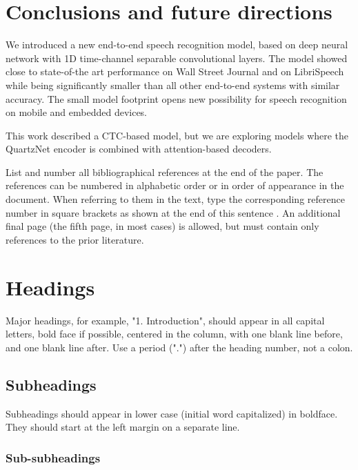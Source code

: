 \documentclass{article}
\begin{document}
\section{Conclusions and future directions}
\label{sec:conclusions}
We introduced a new end-to-end speech recognition model, based on deep neural network with 1D time-channel separable convolutional layers. The model showed close to state-of-the art performance on Wall Street Journal and on LibriSpeech while being significantly smaller than all other end-to-end systems with similar accuracy. The small model footprint opens new possibility for speech recognition on mobile and embedded devices.

This work described a CTC-based model, but we are exploring models where the QuartzNet encoder is combined with attention-based decoders.






\iffalse
List and number all bibliographical references at the end of the
paper. The references can be numbered in alphabetic order or in
order of appearance in the document. When referring to them in
the text, type the corresponding reference number in square
brackets as shown at the end of this sentence \cite{C2}. An
additional final page (the fifth page, in most cases) is
allowed, but must contain only references to the prior
literature.

\section{Headings}
\label{sec:majhead}

Major headings, for example, "1. Introduction", should appear in all capital
letters, bold face if possible, centered in the column, with one blank line
before, and one blank line after. Use a period (".") after the heading number,
not a colon.

\subsection{Subheadings}
\label{ssec:subhead}

Subheadings should appear in lower case (initial word capitalized) in
boldface. They should start at the left margin on a separate line.
 
\subsubsection{Sub-subheadings}
\label{sssec:subsubhead}
\end{document}
